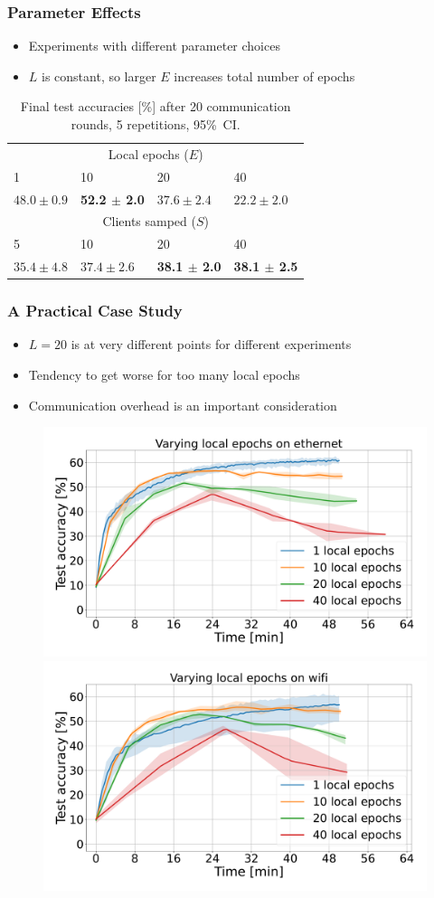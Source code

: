 \documentclass{beamer}
\begin{document}
\begin{frame}
    \frametitle{Parameter Effects}
    \begin{itemize}
        \item Experiments with different parameter choices
        \item $L$ is constant, so larger $E$ increases total number of epochs
    \end{itemize}
    \begin{table}
        \footnotesize
        \centering
        \begin{tabular}{llll}
            \hline
            \multicolumn{4}{c}{Local epochs ($E$)}\\
            1 & 10 & 20 & 40 \\
            \hline
            $48.0 \pm 0.9$ & \textbf{ 52.2 $\pm$ 2.0 } & $37.6 \pm 2.4$ & $22.2 \pm 2.0$ \\
            \multicolumn{4}{c}{Clients samped ($S$)}\\
            5 & 10 & 20 & 40 \\
            \hline
            $35.4 \pm 4.8$ & $37.4 \pm 2.6$ & \textbf{ 38.1 $\pm$ 2.0 } & \textbf{ 38.1 $\pm$ 2.5 } \\
        \end{tabular}
        \caption{Final test accuracies [\%] after 20 communication rounds, 5 repetitions, 95\%\ CI.}
    \end{table}
\end{frame}

\begin{frame}
    \frametitle{A Practical Case Study}
    \small
    \begin{itemize}
        \item $L=20$ is at very different points for different experiments
        \item Tendency to get worse for too many local epochs
        \item Communication overhead is an important consideration
    \end{itemize}
    \begin{figure}[H]
        \centering
        \includegraphics[width=.49\linewidth]{imgs/time_avg_local_epochs_ethernet.pdf}
        \includegraphics[width=.49\linewidth]{imgs/time_avg_local_epochs_wifi.pdf}
    \end{figure}\noindent
\end{frame}
\end{document}
